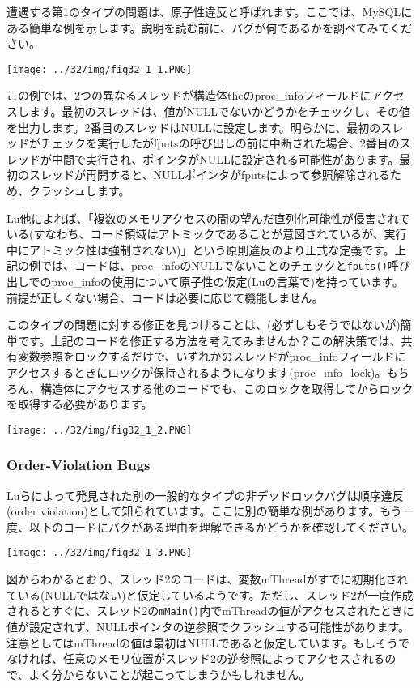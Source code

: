遭遇する第1のタイプの問題は、原子性違反と呼ばれます。ここでは、MySQLにある簡単な例を示します。説明を読む前に、バグが何であるかを調べてみてください。

\texttt{[image: ../32/img/fig32\_1\_1.PNG]}

この例では、2つの異なるスレッドが構造体thcのproc\_infoフィールドにアクセスします。最初のスレッドは、値がNULLでないかどうかをチェックし、その値を出力します。2番目のスレッドはNULLに設定します。明らかに、最初のスレッドがチェックを実行したがfputsの呼び出しの前に中断された場合、2番目のスレッドが中間で実行され、ポインタがNULLに設定される可能性があります。最初のスレッドが再開すると、NULLポインタがfputsによって参照解除されるため、クラッシュします。

Lu他によれば、「複数のメモリアクセスの間の望んだ直列化可能性が侵害されている(すなわち、コード領域はアトミックであることが意図されているが、実行中にアトミック性は強制されない)」という原則違反のより正式な定義です。上記の例では、コードは、proc\_infoのNULLでないことのチェックと\texttt{fputs()}呼び出しでのproc\_infoの使用について原子性の仮定(Luの言葉で)を持っています。前提が正しくない場合、コードは必要に応じて機能しません。

このタイプの問題に対する修正を見つけることは、(必ずしもそうではないが)簡単です。上記のコードを修正する方法を考えてみませんか？この解決策では、共有変数参照をロックするだけで、いずれかのスレッドがproc\_infoフィールドにアクセスするときにロックが保持されるようになります(proc\_info\_lock)。もちろん、構造体にアクセスする他のコードでも、このロックを取得してからロックを取得する必要があります。

\texttt{[image: ../32/img/fig32\_1\_2.PNG]}

\hypertarget{order-violation-bugs}{%
\subsubsection*{Order-Violation Bugs}\label{order-violation-bugs}}

Luらによって発見された別の一般的なタイプの非デッドロックバグは順序違反(order
violation)として知られています。ここに別の簡単な例があります。もう一度、以下のコードにバグがある理由を理解できるかどうかを確認してください。

\texttt{[image: ../32/img/fig32\_1\_3.PNG]}

図からわかるとおり、スレッド2のコードは、変数mThreadがすでに初期化されている(NULLではない)と仮定しているようです。ただし、スレッド2が一度作成されるとすぐに、スレッド2の\texttt{mMain()}内でmThreadの値がアクセスされたときに値が設定されず、NULLポインタの逆参照でクラッシュする可能性があります。注意としてはmThreadの値は最初はNULLであると仮定しています。もしそうでなければ、任意のメモリ位置がスレッド2の逆参照によってアクセスされるので、よく分からないことが起こってしまうかもしれません。


